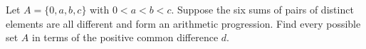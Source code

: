 Let $A=\{0,a,b,c\}$ with $0<a<b<c$. Suppose the six sums of pairs of distinct elements are all different and form an arithmetic progression. Find every possible set $A$ in terms of the positive common difference $d$.
